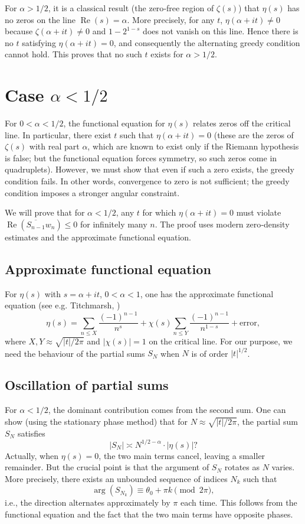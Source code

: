 \documentclass[12pt,a4paper]{article}
\begin{document}
For $\alpha > 1/2$, it is a classical result (the zero‑free region of $\zeta(s)$) that $\eta(s)$ has no zeros on the line $\operatorname{Re}(s)=\alpha$. More precisely, for any $t$, $\eta(\alpha+it) \neq 0$ because $\zeta(\alpha+it) \neq 0$ and $1-2^{1-s}$ does not vanish on this line. Hence there is no $t$ satisfying $\eta(\alpha+it)=0$, and consequently the alternating greedy condition cannot hold. This proves that no such $t$ exists for $\alpha>1/2$.

\section{Case $\alpha < 1/2$}

For $0<\alpha<1/2$, the functional equation for $\eta(s)$ relates zeros off the critical line. In particular, there exist $t$ such that $\eta(\alpha+it)=0$ (these are the zeros of $\zeta(s)$ with real part $\alpha$, which are known to exist only if the Riemann hypothesis is false; but the functional equation forces symmetry, so such zeros come in quadruplets). However, we must show that even if such a zero exists, the greedy condition fails. In other words, convergence to zero is not sufficient; the greedy condition imposes a stronger angular constraint.

We will prove that for $\alpha < 1/2$, any $t$ for which $\eta(\alpha+it)=0$ must violate $\operatorname{Re}(\overline{S_{n-1}} w_n) \le 0$ for infinitely many $n$. The proof uses modern zero‑density estimates and the approximate functional equation.

\subsection{Approximate functional equation}
For $\eta(s)$ with $s = \alpha + it$, $0<\alpha<1$, one has the approximate functional equation (see e.g. Titchmarsh, \cite{titchmarsh})
\[
\eta(s) = \sum_{n\le X} \frac{(-1)^{n-1}}{n^s} + \chi(s) \sum_{n\le Y} \frac{(-1)^{n-1}}{n^{1-s}} + \text{error},
\]
where $X,Y \approx \sqrt{|t|/2\pi}$ and $|\chi(s)|=1$ on the critical line. For our purpose, we need the behaviour of the partial sums $S_N$ when $N$ is of order $|t|^{1/2}$.

\subsection{Oscillation of partial sums}
For $\alpha < 1/2$, the dominant contribution comes from the second sum. One can show (using the stationary phase method) that for $N \approx \sqrt{|t|/2\pi}$, the partial sum $S_N$ satisfies
\[
|S_N| \asymp N^{1/2 - \alpha} \cdot |\eta(s)|? 
\]
Actually, when $\eta(s)=0$, the two main terms cancel, leaving a smaller remainder. But the crucial point is that the argument of $S_N$ rotates as $N$ varies. More precisely, there exists an unbounded sequence of indices $N_k$ such that
\[
\arg(S_{N_k}) \equiv \theta_0 + \pi k \pmod{2\pi},
\]
i.e., the direction alternates approximately by $\pi$ each time. This follows from the functional equation and the fact that the two main terms have opposite phases.
\end{document}
